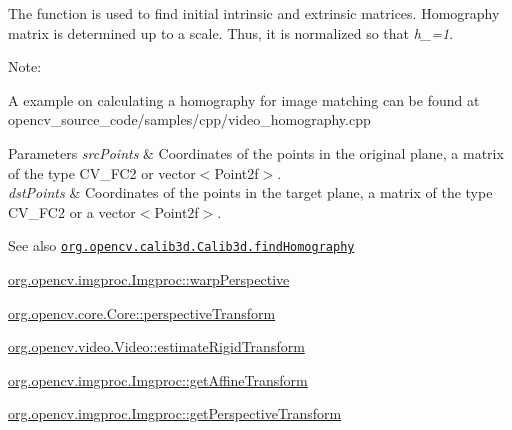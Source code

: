 The function is used to find initial intrinsic and extrinsic matrices. Homography matrix is determined up to a scale. Thus, it is normalized so that {\itshape h\+\_=1}.

Note\+:


\begin{DoxyItemize}
\item A example on calculating a homography for image matching can be found at opencv\+\_\+source\+\_\+code/samples/cpp/video\+\_\+homography.\+cpp 
\end{DoxyItemize}


\begin{DoxyParams}{Parameters}
{\em src\+Points} & Coordinates of the points in the original plane, a matrix of the type {\ttfamily C\+V\+\_\+F\+C2} or {\ttfamily vector$<$\+Point2f$>$}. \\
\hline
{\em dst\+Points} & Coordinates of the points in the target plane, a matrix of the type {\ttfamily C\+V\+\_\+F\+C2} or a {\ttfamily vector$<$\+Point2f$>$}.\\
\hline
\end{DoxyParams}
\begin{DoxySeeAlso}{See also}
\href{http://docs.opencv.org/modules/calib3d/doc/camera_calibration_and_3d_reconstruction.html#findhomography}{\tt org.\+opencv.\+calib3d.\+Calib3d.\+find\+Homography} 

\mbox{\hyperlink{classorg_1_1opencv_1_1imgproc_1_1_imgproc_aad167fa9fe0009a54f7732488102938c}{org.\+opencv.\+imgproc.\+Imgproc\+::warp\+Perspective}} 

\mbox{\hyperlink{classorg_1_1opencv_1_1core_1_1_core_a1ff0eace0f00e79af5228fdae120342a}{org.\+opencv.\+core.\+Core\+::perspective\+Transform}} 

\mbox{\hyperlink{classorg_1_1opencv_1_1video_1_1_video_ad9c2fbb377a485b9619be2c78eaf7cee}{org.\+opencv.\+video.\+Video\+::estimate\+Rigid\+Transform}} 

\mbox{\hyperlink{classorg_1_1opencv_1_1imgproc_1_1_imgproc_a283e61c00d4e6ba9625264d8d7f5f8db}{org.\+opencv.\+imgproc.\+Imgproc\+::get\+Affine\+Transform}} 

\mbox{\hyperlink{classorg_1_1opencv_1_1imgproc_1_1_imgproc_ab3727363e269af640d5254f76e14ddb6}{org.\+opencv.\+imgproc.\+Imgproc\+::get\+Perspective\+Transform}} 
\end{DoxySeeAlso}
\mbox{\label{classorg_1_1opencv_1_1calib3d_1_1_calib3d_aaece56f4a02759da9d1e31d9269e6596}} 
